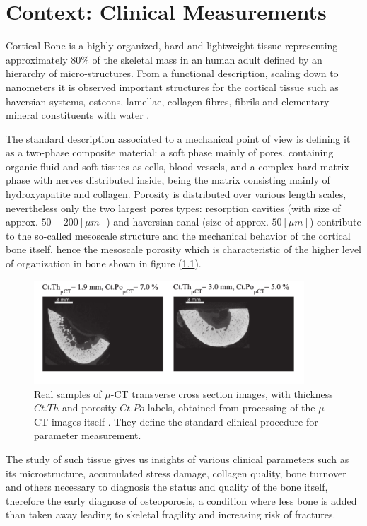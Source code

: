 \chapter{Context: Clinical Measurements}
Cortical Bone is a highly organized, hard and lightweight tissue representing approximately 80\% of the skeletal mass in an human adult defined by an hierarchy of micro-structures. From a functional description, scaling down to nanometers it is observed important structures for the cortical tissue such as haversian systems, osteons, lamellae, collagen fibres, fibrils and elementary mineral constituents with water \cite{Parnell2008}. 

The standard description associated to a mechanical point of view is defining it as a two-phase composite material: a soft phase mainly of pores, containing organic fluid and soft tissues as cells, blood vessels, and a complex hard matrix phase with nerves distributed inside, being the matrix consisting mainly of hydroxyapatite and collagen. Porosity is distributed over various length scales, nevertheless only the two largest pores types: resorption cavities (with size of approx. $50-200 [\mu m]$) and haversian canal (size of approx. $50 [ \mu m ]$) contribute to the so-called mesoscale structure and the mechanical behavior of the cortical bone itself, hence the mesoscale porosity which is characteristic of the higher level of organization in bone shown in figure (\ref{muCT-Images}).

\begin{figure}[!h]
	\centering
	\includegraphics[width=0.9\textwidth]{images/ImgExt/CT-ImagesTwoCases.png}
	\caption{Real samples of $\mu$-CT transverse cross section images, with thickness $Ct.Th$ and porosity $Ct.Po$ labels, obtained from processing of the $\mu$-CT images itself \cite{Minonzio2018}. They define the standard clinical procedure for parameter measurement.}
	\label{muCT-Images}
\end{figure}

The study of such tissue gives us insights of various clinical parameters such as its microstructure, accumulated stress damage, collagen quality, bone turnover and others necessary to diagnosis the status and quality of the bone itself, therefore the early diagnose of osteoporosis, a condition where less bone is added than taken away leading to skeletal fragility and increasing risk of fractures.

